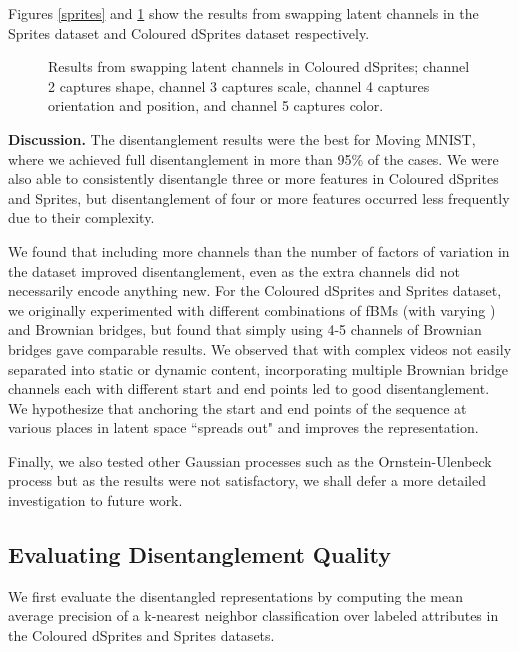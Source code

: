 \documentclass[runningheads]{llncs}
\begin{document}
   
   Figures \ref{sprites} and \ref{cdsprites} show the results from swapping latent channels in the Sprites dataset and Coloured dSprites dataset respectively. \par 
         
	   \begin{figure} [H]
   \centering  
   \caption{Results from swapping latent channels in Coloured dSprites; channel 2 captures shape, channel 3 captures scale, channel 4 captures orientation and position, and channel 5 captures color.}
   \label{cdsprites}
   \end{figure}

   \noindent \textbf{Discussion. }
   The disentanglement results were the best for Moving MNIST, where we achieved full disentanglement in more than 95\% of the cases. We were also able to consistently disentangle three or more features in Coloured dSprites and Sprites, but disentanglement of four or more features occurred less frequently due to their complexity. \par 
   
   We found that including more channels than the number of factors of variation in the dataset improved disentanglement, even as the extra channels did not necessarily encode anything new. For the Coloured dSprites and Sprites dataset, we originally experimented with different combinations of fBMs (with varying ) and Brownian bridges, but found that simply using 4-5 channels of Brownian bridges gave comparable results. We observed that with complex videos not easily separated into static or dynamic content, incorporating multiple Brownian bridge channels each with different start and end points led to good disentanglement. We hypothesize that anchoring the start and end points of the sequence at various places in latent space ``spreads out" and improves the representation. \par 

   Finally, we also tested other Gaussian processes such as the Ornstein-Ulenbeck process \cite{OUProcess} but as the results were not satisfactory, we shall defer a more detailed investigation to future work. \par 

   \subsection{Evaluating Disentanglement Quality}
   We first evaluate the disentangled representations by computing the mean average precision of a k-nearest neighbor classification over labeled attributes in the Coloured dSprites and Sprites datasets. 
\end{document}
